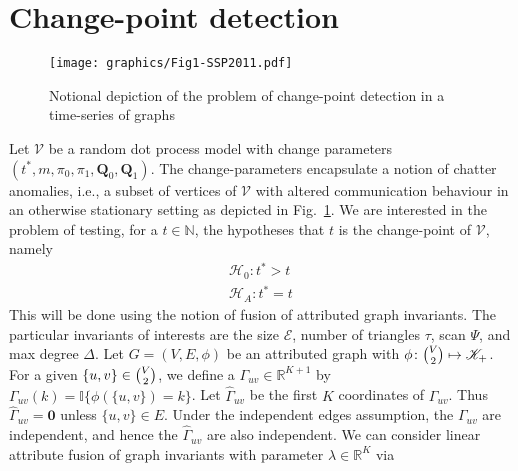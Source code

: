 \documentclass[final]{IEEEtran}
\theoremstyle{definition}
\begin{document}
\section{Change-point detection}
\begin{figure}[htbp]
  \centering
  \texttt{[image: graphics/Fig1-SSP2011.pdf]}
  \caption{Notional depiction of the problem of change-point detection
    in a time-series of graphs}
  \label{fig:notional_change_point}
\end{figure}
Let $\mathscr{V}$ be a random dot process model with change parameters
$(t^{*}, m, \pi_0, \pi_1, \mathbf{Q}_0, \mathbf{Q}_1)$. The
change-parameters encapsulate a notion of chatter anomalies, i.e., a
subset of vertices of $\mathscr{V}$ with altered communication
behaviour in an otherwise stationary setting as depicted in
Fig.~\ref{fig:notional_change_point}. We are interested in the problem
of testing, for a $t \in \mathbb{N}$, the hypotheses that $t$ is the
change-point of $\mathscr{V}$, namely
\begin{gather*}
  \mathscr{H}_0 \colon t^{*} > t \\
  \mathscr{H}_A \colon t^{*} = t
\end{gather*}
This will be done using the notion of fusion of attributed graph
invariants.  The particular invariants of interests are the size
$\mathcal{E}$, number of triangles $\tau$, scan $\Psi$, and
max degree $\Delta$. Let $G = (V,E,\phi)$ be an attributed graph with 
$\phi \colon \tbinom{V}{2} \mapsto \mathscr{K}_{+}$. For a given
$\{u,v\} \in \tbinom{V}{2}$, we define a $\Gamma_{uv} \in
\mathbb{R}^{K+1}$ by $\Gamma_{uv}(k) = \mathbb{I}\{\phi(\{u,v\}) =
k\}$. Let $\widehat{\Gamma}_{uv}$ be the first $K$ coordinates of
$\Gamma_{uv}$. Thus $\widehat{\Gamma}_{uv} = \bm{0}$ unless $\{u,v\}
\in E$. Under the independent edges assumption, the
$\Gamma_{uv}$ are independent, and hence the $\widehat{\Gamma}_{uv}$
are also independent. We can consider linear attribute fusion of graph invariants with
parameter $\lambda \in \mathbb{R}^{K}$ via
\end{document}
